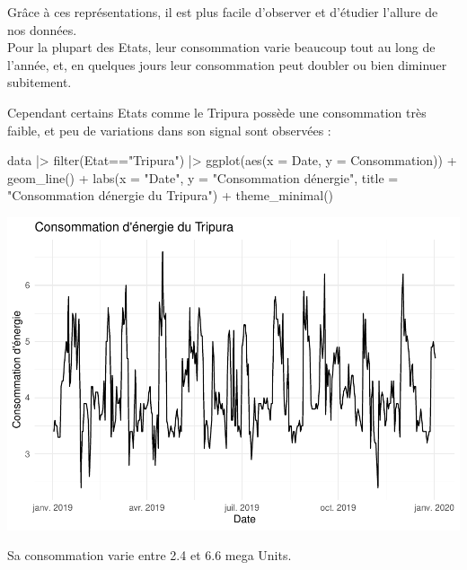 \documentclass[
]{article}
\newenvironment{Shaded}{\begin{snugshade}}{\end{snugshade}}
\newcommand{\AttributeTok}[1]{\textcolor[rgb]{0.77,0.63,0.00}{#1}}
\newcommand{\FunctionTok}[1]{\textcolor[rgb]{0.00,0.00,0.00}{#1}}
\newcommand{\NormalTok}[1]{#1}
\newcommand{\SpecialCharTok}[1]{\textcolor[rgb]{0.00,0.00,0.00}{#1}}
\newcommand{\StringTok}[1]{\textcolor[rgb]{0.31,0.60,0.02}{#1}}
\begin{document}
Grâce à ces représentations, il est plus facile d'observer et d'étudier
l'allure de nos données.\\

Pour la plupart des Etats, leur consommation varie beaucoup tout au long
de l'année, et, en quelques jours leur consommation peut doubler ou bien
diminuer subitement.

Cependant certains Etats comme le Tripura possède une consommation très
faible, et peu de variations dans son signal sont observées :

\begin{Shaded}
\begin{Highlighting}[]
\NormalTok{data }\SpecialCharTok{|\textgreater{}} 
  \FunctionTok{filter}\NormalTok{(Etat}\SpecialCharTok{==}\StringTok{"Tripura"}\NormalTok{) }\SpecialCharTok{|\textgreater{}} 
  \FunctionTok{ggplot}\NormalTok{(}\FunctionTok{aes}\NormalTok{(}\AttributeTok{x =}\NormalTok{ Date, }\AttributeTok{y =}\NormalTok{ Consommation)) }\SpecialCharTok{+}
  \FunctionTok{geom\_line}\NormalTok{() }\SpecialCharTok{+}
  \FunctionTok{labs}\NormalTok{(}\AttributeTok{x =} \StringTok{"Date"}\NormalTok{, }\AttributeTok{y =} \StringTok{"Consommation d\textquotesingle{}énergie"}\NormalTok{, }
       \AttributeTok{title =} \StringTok{"Consommation d\textquotesingle{}énergie du Tripura"}\NormalTok{) }\SpecialCharTok{+}
  \FunctionTok{theme\_minimal}\NormalTok{()}
\end{Highlighting}
\end{Shaded}

\includegraphics{Projet_CHESNAIS_GUIBERT_files/figure-latex/unnamed-chunk-13-1.pdf}

Sa consommation varie entre 2.4 et 6.6 mega Units.
\end{document}
